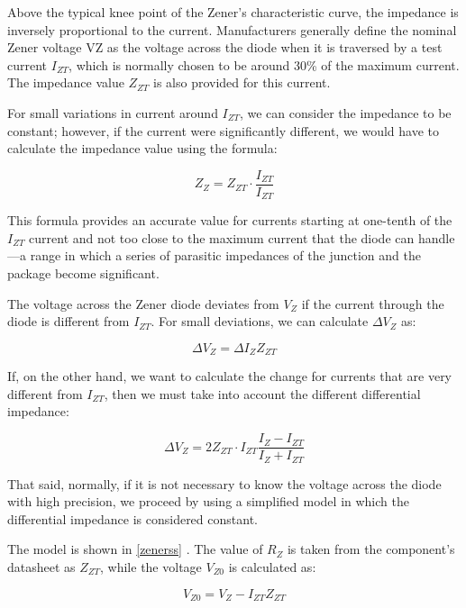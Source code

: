 \documentclass[../main.tex]{subfiles}
\begin{document}
Above the typical knee point of the Zener’s characteristic curve, the impedance is inversely proportional to the current. Manufacturers generally define the nominal Zener voltage VZ as the voltage across the diode when it is traversed by a test current $I_{ZT}$, which is normally chosen to be around 30\% of the maximum current. The impedance value $Z_{ZT}$ is also provided for this current. 

For small variations in current around $I_{ZT}$, we can consider the impedance to be constant; however, if the current were significantly different, we would have to calculate the impedance value using the formula:

\begin{equation}
	Z_Z = Z_{ZT} \cdot \frac{I_{ZT}}{I_{ZT}}
\end{equation}


This formula provides an accurate value for currents starting at one-tenth of the $I_{ZT}$ current and not too close to the maximum current that the diode can handle—a range in which a series of parasitic impedances of the junction and the package become significant.

The voltage across the Zener diode deviates from $V_Z$ if the current through the diode is different from $I_{ZT}$. For small deviations, we can calculate $\Delta V_Z$ as:

\begin{equation}
	\Delta V_Z = \Delta I_Z Z_{ZT}
\end{equation}


If, on the other hand, we want to calculate the change for currents that are very different from $I_{ZT}$, then we must take into account the different differential impedance:

\begin{equation}
	\Delta V_Z = 2Z_{ZT} \cdot I_{ZT} \frac{I_Z - I_{ZT}}{I_Z + I_{ZT}}
\end{equation}

That said, normally, if it is not necessary to know the voltage across the diode with high precision, we proceed by using a simplified model in which the differential impedance is considered constant. 

The model is shown in \autoref{zenerss} . The value of $R_Z$ is taken from the component’s datasheet as $Z_{ZT}$, while the voltage $V_{Z0}$ is calculated as:

\begin{equation}
	V_{Z0} = V_Z - I_{ZT}Z_{ZT}
\end{equation}
\end{document}
